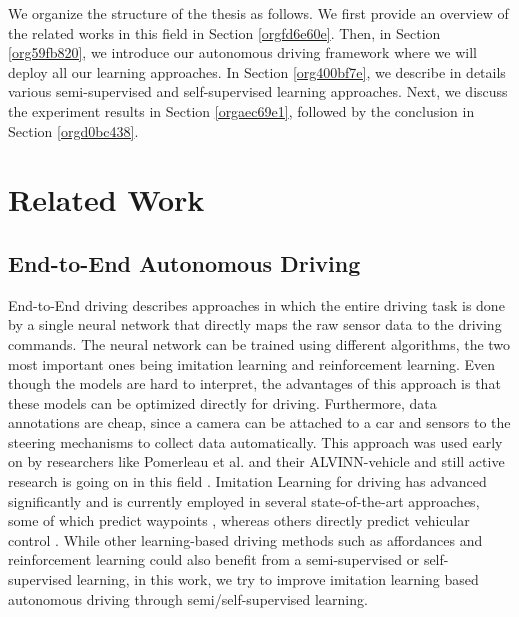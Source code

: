 \documentclass[letterpaper, 12pt]{book}
\theoremstyle{definition}
\theoremstyle{definition}
\theoremstyle{definition}
\theoremstyle{definition}
\theoremstyle{definition}
\begin{document}
We organize the structure of the thesis as follows. We first provide an overview
of the related works in this field in Section \ref{orgfd6e60e}. Then, in Section \ref{org59fb820}, we introduce
our autonomous driving framework where we will deploy all our learning
approaches. In Section \ref{org400bf7e}, we describe in details various
semi-supervised and self-supervised learning approaches. Next, we discuss the
experiment results in Section \ref{orgaec69e1}, followed by the conclusion in Section \ref{orgd0bc438}.

\chapter{Related Work \label{orgfd6e60e}}
\label{sec:orgd21562e}
\section{End-to-End Autonomous Driving}
\label{sec:org7f01473}
End-to-End driving describes approaches in which the entire driving task is done
by a single neural network that directly maps the raw sensor data to the driving
commands. The neural network can be trained using different algorithms, the two
most important ones being imitation learning and reinforcement learning. Even
though the models are hard to interpret, the advantages of this approach is that
these models can be optimized directly for driving. Furthermore, data
annotations are cheap, since a camera can be attached to a car and sensors to
the steering mechanisms to collect data automatically. This approach was used
early on by researchers like Pomerleau et al. and their ALVINN-vehicle
\cite{Pomerleau1988} and still active research is going on in this field
\cite{Janai2020,Tampuu2020}. Imitation Learning for driving has advanced
significantly \cite{Bojarski2016,Codevilla2017,Mueller2018} and is currently
employed in several state-of-the-art approaches, some of which predict waypoints
\cite{Casas2021,Chen2019,Filos2020}, whereas others directly predict vehicular
control
\cite{Behl2020,Buehler2020,Codevilla2019,9157137,Xiao2019,Prakash2020}. While
other learning-based driving methods such as affordances
\cite{Sauer2018,Xiao2020} and reinforcement learning
\cite{chen2021learning,Toromanoff2019,Wang2020a} could also benefit from a
semi-supervised or self-supervised learning, in this work, we try to improve
imitation learning based autonomous driving through semi/self-supervised
learning.
\end{document}
